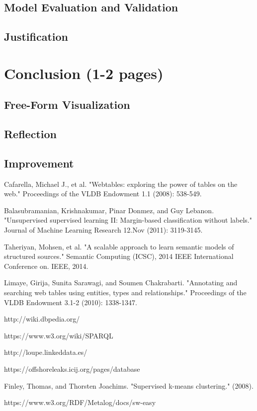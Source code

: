 \documentclass{article}
\begin{document}
\subsection{Model Evaluation and Validation}
\subsection{Justification}

\section{Conclusion (1-2 pages)}
 \subsection{Free-Form Visualization}
 \subsection{Reflection}
 \subsection{Improvement}
 
 
\begin{thebibliography}{99}

Cafarella, Michael J., et al. "Webtables: exploring the power of tables on the web." Proceedings of the VLDB Endowment 1.1 (2008): 538-549.

Balasubramanian, Krishnakumar, Pinar Donmez, and Guy Lebanon. "Unsupervised supervised learning II: Margin-based classification without labels." Journal of Machine Learning Research 12.Nov (2011): 3119-3145.

Taheriyan, Mohsen, et al. "A scalable approach to learn semantic models of structured sources." Semantic Computing (ICSC), 2014 IEEE International Conference on. IEEE, 2014.

Limaye, Girija, Sunita Sarawagi, and Soumen Chakrabarti. "Annotating and searching web tables using entities, types and relationships." Proceedings of the VLDB Endowment 3.1-2 (2010): 1338-1347.

http://wiki.dbpedia.org/

https://www.w3.org/wiki/SPARQL

http://loupe.linkeddata.es/

https://offshoreleaks.icij.org/pages/database

Finley, Thomas, and Thorsten Joachims. "Supervised k-means clustering." (2008).










https://www.w3.org/RDF/Metalog/docs/sw-easy





\end{thebibliography}
\end{document}
